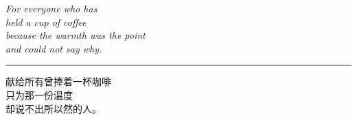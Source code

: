 \thispagestyle{empty}
\vspace*{\fill}
\begin{center}
\itshape
For everyone who has\\
held a cup of coffee\\
because the warmth was the point\\
and could not say why.\par
\vspace{2em}
{\color{rule}\rule{4em}{0.3pt}}\par
\vspace{2em}
\normalfont\footnotesize\color{dim}
献给所有曾捧着一杯咖啡\\
只为那一份温度\\
却说不出所以然的人。
\end{center}
\vspace*{\fill}
